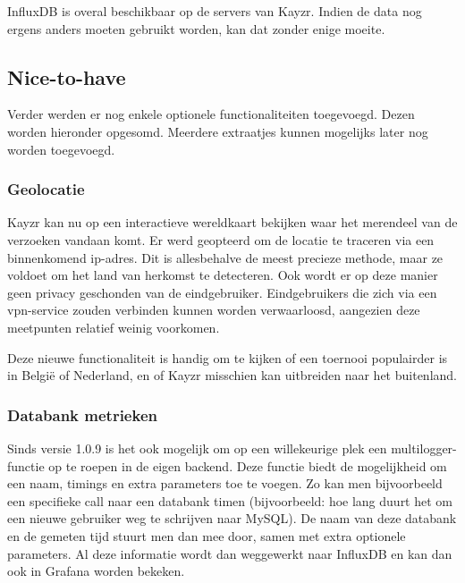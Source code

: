 InfluxDB is overal beschikbaar op de servers van Kayzr. Indien de data nog ergens anders moeten gebruikt worden, kan dat zonder enige moeite.

\subsection{Nice-to-have}
\label{sec:nicetohave}

Verder werden er nog enkele optionele functionaliteiten toegevoegd. Dezen worden hieronder opgesomd. Meerdere extraatjes kunnen mogelijks later nog worden toegevoegd.

\subsubsection{Geolocatie}
\label{sec:geolocation}

Kayzr kan nu op een interactieve wereldkaart bekijken waar het merendeel van de verzoeken vandaan komt. Er werd geopteerd om de locatie te traceren via een binnenkomend ip-adres. Dit is allesbehalve de meest precieze methode, maar ze voldoet om het land van herkomst te detecteren. Ook wordt er op deze manier geen privacy geschonden van de eindgebruiker. Eindgebruikers die zich via een vpn-service zouden verbinden kunnen worden verwaarloosd, aangezien deze meetpunten relatief weinig voorkomen.

Deze nieuwe functionaliteit is handig om te kijken of een toernooi populairder is in België of Nederland, en of Kayzr misschien kan uitbreiden naar het buitenland.

\subsubsection{Databank metrieken}
\label{sec:databaseMetrics}

Sinds versie 1.0.9 is het ook mogelijk om op een willekeurige plek een multilogger-functie op te roepen in de eigen backend. Deze functie biedt de mogelijkheid om een naam, timings en extra parameters toe te voegen. Zo kan men bijvoorbeeld een specifieke call naar een databank timen (bijvoorbeeld: hoe lang duurt het om een nieuwe gebruiker weg te schrijven naar MySQL). De naam van deze databank en de gemeten tijd stuurt men dan mee door, samen met extra optionele parameters. Al deze informatie wordt dan weggewerkt naar InfluxDB en kan dan ook in Grafana worden bekeken. 

